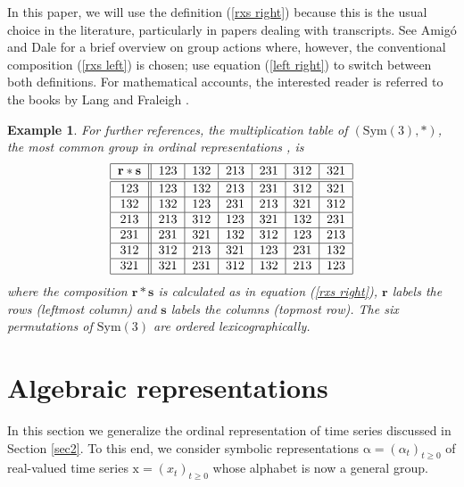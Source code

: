\documentclass[%
 aip,
 amsmath,amssymb,
 reprint,%
]{revtex4-1}
\newtheorem{example}[theorem]{Example}
\begin{document}
In this paper, we will use the definition (\ref{rxs right}) because this is
the usual choice in the literature, particularly in papers dealing with
transcripts. See Amig\'{o} and Dale \cite{Amigo2025} for a brief overview on
group actions where, however, the conventional composition (\ref{rxs left})
is chosen; use equation (\ref{left right}) to switch between both
definitions. For mathematical accounts, the interested reader is referred to
the books by Lang \cite{Lang2005} and Fraleigh \cite{Fraleigh2013}.

\begin{example}
For further references, the multiplication table of $(\mathrm{Sym}(3),\ast )$, the most common group in ordinal representations \cite{Bandt2019,Bandt2007}, is
\begin{equation}
\begin{tabular}{|c||l|l|l|l|l|l|}
\hline
$\mathbf{r}\ast \mathbf{s}$ & $123$ & $132$ & $213$ & $231$ & $312$ & $321$
\\ \hline\hline
$123$ & $123$ & $132$ & $213$ & $231$ & $312$ & $321$ \\ \hline
$132$ & $132$ & $123$ & $231$ & $213$ & $321$ & $312$ \\ \hline
$213$ & $213$ & $312$ & $123$ & $321$ & $132$ & $231$ \\ \hline
$231$ & $231$ & $321$ & $132$ & $312$ & $123$ & $213$ \\ \hline
$312$ & $312$ & $213$ & $321$ & $123$ & $231$ & $132$ \\ \hline
$321$ & $321$ & $231$ & $312$ & $132$ & $213$ & $123$ \\ \hline
\end{tabular}
\label{mult table Sym(3)B}
\end{equation}
where the composition $\mathbf{r}\ast \mathbf{s}$ is calculated as in equation
(\ref{rxs right}), $\mathbf{r}$ labels the rows (leftmost column) and $%
\mathbf{s}$ labels the columns (topmost row). The six permutations of $%
\mathrm{Sym}(3)$ are ordered lexicographically.
\end{example}


\section{Algebraic representations}

\label{sec3}

In this section we generalize the ordinal representation of time series
discussed in Section \ref{sec2}. To this end, we consider symbolic
representations $\mathrm{\alpha }=(\alpha _{t})_{t\geq 0}$ of real-valued
time series $\mathrm{x}=(x_{t})_{t\geq 0}$ whose alphabet is now a general
group.
\end{document}

